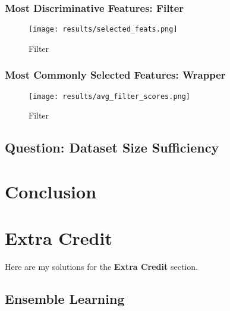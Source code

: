\documentclass[12pt,twoside,a4paper]{article}
\begin{document}
\subsubsection*{Most Discriminative Features: Filter}

\begin{figure}[H]
    \centering
    \texttt{[image: results/selected\_feats.png]}
    \caption{Filter}
    \label{fig: FW6}
\end{figure}

\subsubsection*{Most Commonly Selected Features: Wrapper}

\begin{figure}[H]
    \centering
    \texttt{[image: results/avg\_filter\_scores.png]}
    \caption{Filter}
    \label{fig: FW7}
\end{figure}

\subsection{Question: Dataset Size Sufficiency}

\section{Conclusion}

\section{Extra Credit}
Here are my solutions for the \textbf{Extra Credit} section.
\subsection{Ensemble Learning}

{\small

}
\end{document}
